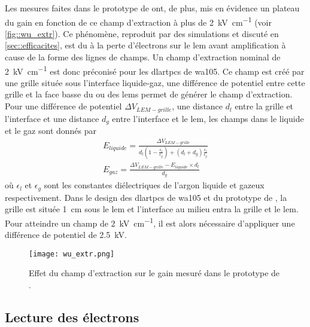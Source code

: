       Les mesures faites dans le prototype de \threeL{} ont, de plus, mis en évidence un plateau du gain en fonction de ce champ d'extraction à plus de \SI{2}{\kilo\volt\per\centi\meter} (voir \autoref{fig::wu_extr}). Ce phénomène, reproduit par des simulations et discuté en \autoref{sec::efficacites}, est du à la perte d'électrons sur le \gls{lem} avant amplification à cause de la forme des lignes de champs. Un champ d'extraction nominal de \SI{2}{\kilo\volt\per\centi\meter} est donc préconisé pour les \glspl{dlartpc} de \gls{wa105}. Ce champ est créé par une grille située sous l'interface liquide-gaz, une différence de potentiel entre cette grille et la face basse du ou des \glspl{lem} permet de générer le champ d'extraction. Pour une différence de potentiel $\Delta V_{LEM-grille}$, une distance $d_l$ entre la grille et l'interface et une distance $d_g$ entre l'interface et le \gls{lem}, les champs dans le liquide et le gaz sont donnés par
      \begin{eqnarray}\label{eq::fields_liquid_gas}
          E_{liquide} = \frac{\Delta V_{LEM-grille}}{d_l(1-\frac{\epsilon_l}{\epsilon_g}) + (d_l+d_g)\frac{\epsilon_l}{\epsilon_g}} \\ 
          E_{gaz} = \frac{\Delta V_{LEM-grille} - E_{liquide} \times d_l}{d_g}
        \end{eqnarray}
      où $\epsilon_l$ et $\epsilon_g$ sont les constantes diélectriques de l'argon liquide et gazeux respectivement. Dans le design des \glspl{dlartpc} de \gls{wa105} et du prototype de \threeL{}, la grille est située \SI{1}{\centi\meter} sous le \gls{lem} et l'interface au milieu entra la grille et le \gls{lem}. Pour atteindre un champ de \SI{2}{\kilo\volt\per\centi\meter}, il est alors nécessaire d'appliquer une différence de potentiel de \SI{2.5}{\kilo\volt}.

      \begin{figure}[htbp]
        \centering
        \texttt{[image: wu\_extr.png]}
        \caption[Effet du champ d'extraction sur le gain mesuré dans le prototype de \threeL{}]{\label{fig::wu_extr}Effet du champ d'extraction sur le gain mesuré dans le prototype de \threeL{}\cite{Wu2017}.}
      \end{figure}

    \subsection{Lecture des électrons}\label{sec::induction}
    
